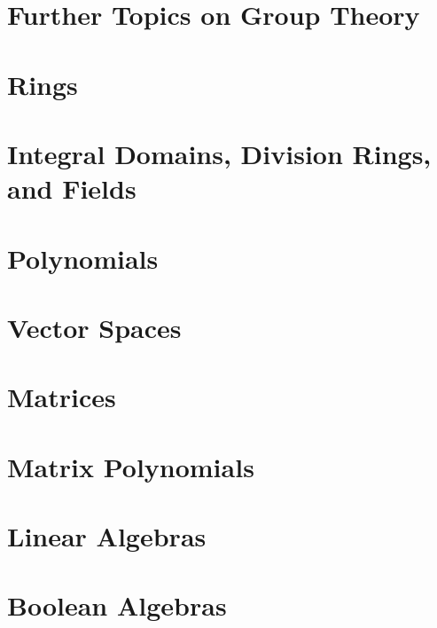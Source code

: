 \documentclass{book}
\begin{document}
\chapter{Further Topics on Group Theory}
\chapter{Rings}
\chapter{Integral Domains, Division Rings, and Fields}
\chapter{Polynomials}
\chapter{Vector Spaces}
\chapter{Matrices}
\chapter{Matrix Polynomials}
\chapter{Linear Algebras}
\chapter{Boolean Algebras}
\end{document}
